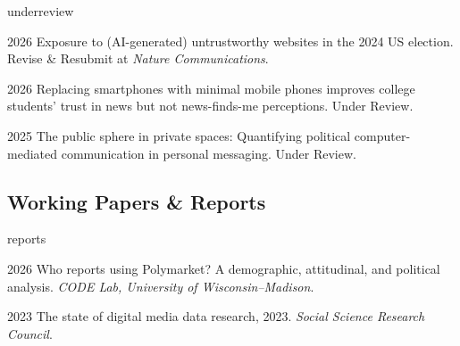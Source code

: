 \begin{publist}{underreview}

  {2026}
  {Exposure to (AI-generated) untrustworthy websites in the 2024 US election.}
  {Revise \& Resubmit at \textit{Nature Communications}. }
  {}

  {2026}
  {Replacing smartphones with minimal mobile phones improves college students' trust in news but not news-finds-me perceptions.}
  {Under Review.}
  {}

  {2025}
  {The public sphere in private spaces: Quantifying political computer-mediated communication in personal messaging.}
  {Under Review. }
  {}

\end{publist}

\subsection{Working Papers \& Reports}

\begin{publist}{reports}

  {2026}
  {Who reports using Polymarket? A demographic, attitudinal, and political analysis.}
  {\textit{CODE Lab, University of Wisconsin--Madison}. }
  {}

  {2023}
  {The state of digital media data research, 2023.}
  {\textit{Social Science Research Council}. }
  {}

\end{publist}
